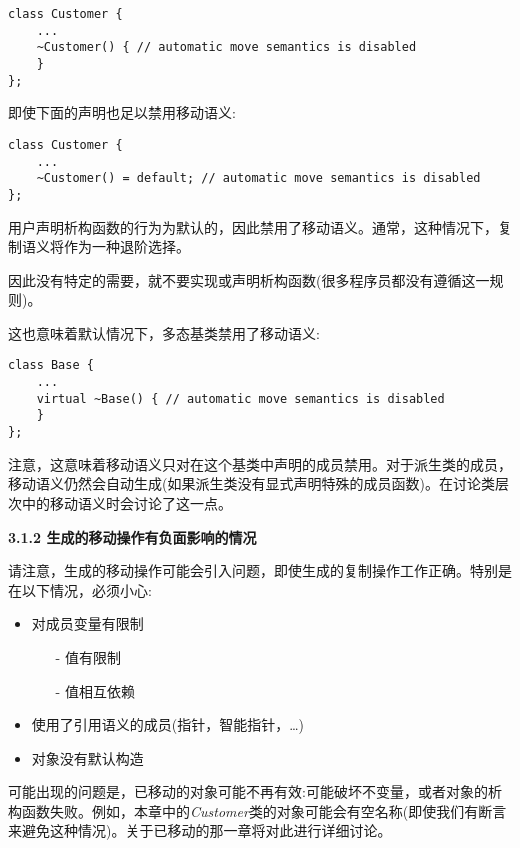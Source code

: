 \begin{lstlisting}[caption={}]
class Customer {
	...
	~Customer() { // automatic move semantics is disabled
	}
};
\end{lstlisting}

即使下面的声明也足以禁用移动语义:\par

\begin{lstlisting}[caption={}]
class Customer {
	...
	~Customer() = default; // automatic move semantics is disabled
};
\end{lstlisting}

用户声明析构函数的行为为默认的，因此禁用了移动语义。通常，这种情况下，复制语义将作为一种退阶选择。\par

因此没有特定的需要，就不要实现或声明析构函数(很多程序员都没有遵循这一规则)。\par

这也意味着默认情况下，多态基类禁用了移动语义:\par

\begin{lstlisting}[caption={}]
class Base {
	...
	virtual ~Base() { // automatic move semantics is disabled
	}
};
\end{lstlisting}

注意，这意味着移动语义只对在这个基类中声明的成员禁用。对于派生类的成员，移动语义仍然会自动生成(如果派生类没有显式声明特殊的成员函数)。在讨论类层次中的移动语义时会讨论了这一点。\par

\hspace*{\fill} \par %
\textbf{3.1.2 生成的移动操作有负面影响的情况}

请注意，生成的移动操作可能会引入问题，即使生成的复制操作工作正确。特别是在以下情况，必须小心:\par

\begin{itemize}
	\item 对成员变量有限制
	\begin{itemize}
		\item[-] 值有限制
		\item[-] 值相互依赖
	\end{itemize}
	\item 使用了引用语义的成员(指针，智能指针，…)
	\item 对象没有默认构造
\end{itemize}

可能出现的问题是，已移动的对象可能不再有效:可能破坏不变量，或者对象的析构函数失败。例如，本章中的\textit{Customer}类的对象可能会有空名称(即使我们有断言来避免这种情况)。关于已移动的那一章将对此进行详细讨论。\par











